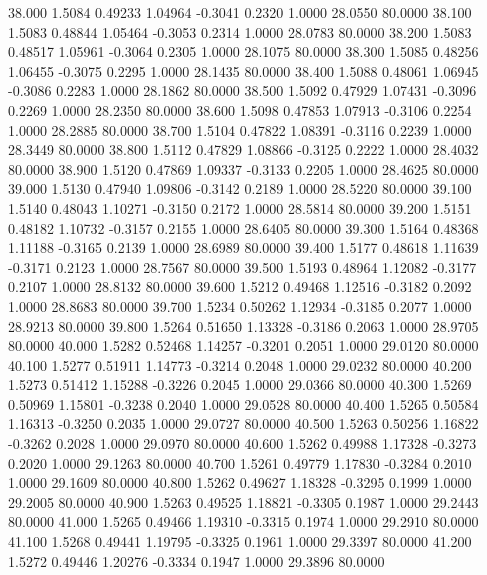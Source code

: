   38.000   1.5084   0.49233   1.04964  -0.3041   0.2320   1.0000  28.0550  80.0000
  38.100   1.5083   0.48844   1.05464  -0.3053   0.2314   1.0000  28.0783  80.0000
  38.200   1.5083   0.48517   1.05961  -0.3064   0.2305   1.0000  28.1075  80.0000
  38.300   1.5085   0.48256   1.06455  -0.3075   0.2295   1.0000  28.1435  80.0000
  38.400   1.5088   0.48061   1.06945  -0.3086   0.2283   1.0000  28.1862  80.0000
  38.500   1.5092   0.47929   1.07431  -0.3096   0.2269   1.0000  28.2350  80.0000
  38.600   1.5098   0.47853   1.07913  -0.3106   0.2254   1.0000  28.2885  80.0000
  38.700   1.5104   0.47822   1.08391  -0.3116   0.2239   1.0000  28.3449  80.0000
  38.800   1.5112   0.47829   1.08866  -0.3125   0.2222   1.0000  28.4032  80.0000
  38.900   1.5120   0.47869   1.09337  -0.3133   0.2205   1.0000  28.4625  80.0000
  39.000   1.5130   0.47940   1.09806  -0.3142   0.2189   1.0000  28.5220  80.0000
  39.100   1.5140   0.48043   1.10271  -0.3150   0.2172   1.0000  28.5814  80.0000
  39.200   1.5151   0.48182   1.10732  -0.3157   0.2155   1.0000  28.6405  80.0000
  39.300   1.5164   0.48368   1.11188  -0.3165   0.2139   1.0000  28.6989  80.0000
  39.400   1.5177   0.48618   1.11639  -0.3171   0.2123   1.0000  28.7567  80.0000
  39.500   1.5193   0.48964   1.12082  -0.3177   0.2107   1.0000  28.8132  80.0000
  39.600   1.5212   0.49468   1.12516  -0.3182   0.2092   1.0000  28.8683  80.0000
  39.700   1.5234   0.50262   1.12934  -0.3185   0.2077   1.0000  28.9213  80.0000
  39.800   1.5264   0.51650   1.13328  -0.3186   0.2063   1.0000  28.9705  80.0000
  40.000   1.5282   0.52468   1.14257  -0.3201   0.2051   1.0000  29.0120  80.0000
  40.100   1.5277   0.51911   1.14773  -0.3214   0.2048   1.0000  29.0232  80.0000
  40.200   1.5273   0.51412   1.15288  -0.3226   0.2045   1.0000  29.0366  80.0000
  40.300   1.5269   0.50969   1.15801  -0.3238   0.2040   1.0000  29.0528  80.0000
  40.400   1.5265   0.50584   1.16313  -0.3250   0.2035   1.0000  29.0727  80.0000
  40.500   1.5263   0.50256   1.16822  -0.3262   0.2028   1.0000  29.0970  80.0000
  40.600   1.5262   0.49988   1.17328  -0.3273   0.2020   1.0000  29.1263  80.0000
  40.700   1.5261   0.49779   1.17830  -0.3284   0.2010   1.0000  29.1609  80.0000
  40.800   1.5262   0.49627   1.18328  -0.3295   0.1999   1.0000  29.2005  80.0000
  40.900   1.5263   0.49525   1.18821  -0.3305   0.1987   1.0000  29.2443  80.0000
  41.000   1.5265   0.49466   1.19310  -0.3315   0.1974   1.0000  29.2910  80.0000
  41.100   1.5268   0.49441   1.19795  -0.3325   0.1961   1.0000  29.3397  80.0000
  41.200   1.5272   0.49446   1.20276  -0.3334   0.1947   1.0000  29.3896  80.0000
